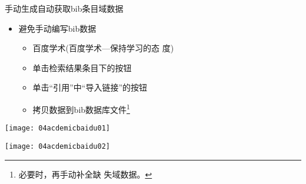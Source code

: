 \documentclass[fontset = none, t]{ctexbeamer}
\begin{document}
\begin{frame}[fragile]{手动生成}{自动获取bib条目域数据}
  \begin{spacing}{1.5}
    \begin{itemize}
    \item 避免手动编写bib数据
      \begin{itemize}
      \item 百度学术(百度学术---保持学习的态
        度)
      \item 单击检索结果条目下的\alert{}按钮
      \item 单击\enquote{引用}中\enquote{导入链接}的\alert{}按钮
      \item 拷贝数据到bib数据库文件\footnote[frame,2]{必要时，再手动补全缺
          失域数据。}
      \end{itemize}
    \end{itemize}    
    \begin{center}
      \begin{annotatedFigure}
        {\texttt{[image: 04acdemicbaidu01]}}
      \end{annotatedFigure}\quad
      \begin{annotatedFigure}
        {\texttt{[image: 04acdemicbaidu02]}}
      \end{annotatedFigure}
    \end{center}
  \end{spacing}
\end{frame}
\end{document}
